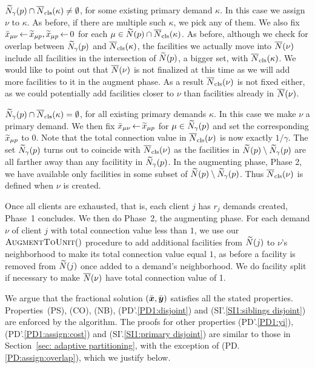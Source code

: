 \documentclass{llncs}
\begin{document}
\smallskip
\noindent
{} ${\widetilde N}_{\gamma}(p) \cap
  {\overline{N}}_{\text{cls}}(\kappa)\neq\emptyset$, for some existing primary demand
  $\kappa$.  In this case we assign $\nu$ to $\kappa$. As before, if
  there are multiple such $\kappa$, we pick any of them. We also fix
  ${\bar x}_{\mu \nu} {\,\leftarrow\,} {\widetilde x}_{\mu p}, {\widetilde x}_{\mu p}{\,\leftarrow\,} 0$
  for each $\mu \in {\widetilde N}(p)\cap {\overline{N}}_{\text{cls}}(\kappa)$. As before,
  although we check for overlap between ${\widetilde N}_{\gamma}(p)$ and
  ${\overline{N}}_{\text{cls}}(\kappa)$, the facilities we actually move into
  ${\overline{N}}(\nu)$ include all facilities in the intersection of
  ${\widetilde N}(p)$, a bigger set, with ${\overline{N}}_{\text{cls}}(\kappa)$. We would
  like to point out that ${\overline{N}}(\nu)$ is not finalized at this time
  as we will add more facilities to it in the augment phase. As a
  result ${\overline{N}}_{\text{cls}}(\nu)$ is not fixed either, as we could
  potentially add facilities closer to $\nu$ than facilities already
  in ${\overline{N}}(\nu)$.

\smallskip
\noindent
{} ${\widetilde N}_{\gamma}(p) \cap {\overline{N}}_{\text{cls}}(\kappa) =
  \emptyset$, for all existing primary demands $\kappa$.  In this case
  we make $\nu$ a primary demand. We then fix ${\bar x}_{\mu \nu}{\,\leftarrow\,}
  {\widetilde x}_{\mu p}$ for $\mu \in {\widetilde N}_{\gamma}(p)$ and set the
  corresponding ${\widetilde x}_{\mu p}$ to $0$.  Note that the total
  connection value in ${\overline{N}}_{\text{cls}}(\nu)$ is now exactly $1/\gamma$.
  The set ${\widetilde N}_{\gamma}(p)$ turns out to coincide with
  ${\overline{N}}_{\text{cls}}(\nu)$ as the facilities in ${\widetilde N}(p) \setminus
  {\widetilde N}_{\gamma}(p)$ are all farther away than any facilitity in
  ${\widetilde N}_{\gamma}(p)$. In the augmenting phase, Phase 2, we have
  available only facilities in some subset of ${\widetilde N}(p) \setminus
  {\widetilde N}_{\gamma}(p)$. Thus ${\overline{N}}_{\text{cls}}(\nu)$ is defined when $\nu$
  is created.

\smallskip

Once all clients are exhausted, that is, each client $j$ has $r_j$
demands created, Phase~1 concludes. We then do Phase~2, the augmenting
phase.  For each demand $\nu$ of client $j$ with total connection
value less than $1$, we use our ${\textsc{AugmentToUnit}}()$ procedure to add
additional facilities from ${\widetilde N}(j)$ to $\nu$'s neighborhood to
make its total connection value equal $1$, as before a facility is
removed from ${\widetilde N}(j)$ once added to a demand's neighborhood. We
do facility split if necessary to make ${\overline{N}}(\nu)$ have total
connection value of 1.  

\smallskip

We argue that the fractional solution $(\bar{\boldsymbol{x}},\bar{\boldsymbol{y}})$
satisfies all the stated properties. Properties~(PS), (CO), (NB),
(PD'.\ref{PD1:disjoint}) and (SI'.\ref{SI1:siblings disjoint}) are
enforced by the algorithm. The proofs
for other properties (PD'.\ref{PD1:yi}), (PD'.\ref{PD1:assign:cost})
and (SI'.\ref{SI1:primary disjoint}) are similar to those in
Section~\ref{sec: adaptive partitioning}, with the exception of
(PD.\ref{PD:assign:overlap}), which we justify below.
\end{document}
